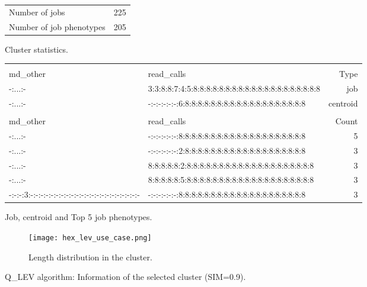 \documentclass{jhps}
\begin{document}
\begin{figure}
	\begin{subtable}{\textwidth}
		\centering
		\begin{tabular}{ll}
			Number of jobs & 225 \\
			Number of job phenotypes & 205 \\
		\end{tabular}
		\caption{Cluster statistics.}
		\label{cluster:use_case:hex_lev:stats}
	\end{subtable}
	\medskip
	\noindent\begin{subtable}{\textwidth}
		\centering
		\begin{tiny}
			\begin{tabular}{ll|r}
				\rowcolor{tblhead}
				\multicolumn{2}{l|}{Q-coding} & \\
				\rowcolor{tblhead}
				md\_other                                           &  read\_calls                                           & Type     \\
        \hline
        -:...:-                                             & 3:3:8:8:7:4:5:8:8:8:8:8:8:8:8:8:8:8:8:8:8:8:8:8:8:8:8 & job      \\ 
        -:...:-                                             & -:-:-:-:-:-:6:8:8:8:8:8:8:8:8:8:8:8:8:8:8:8:8:8:8:8   & centroid \\ 
				\multicolumn{3}{l}{}                                \\
				\rowcolor{tblhead}      md\_other                   &  read\_calls                                           & Count    \\
				\hline
        -:...:-                                             & -:-:-:-:-:-:8:8:8:8:8:8:8:8:8:8:8:8:8:8:8:8:8:8:8:8   & 5        \\ 
        -:...:-                                             & -:-:-:-:-:-:2:8:8:8:8:8:8:8:8:8:8:8:8:8:8:8:8:8:8:8   & 3        \\ 
        -:...:-                                             & 8:8:8:8:8:2:8:8:8:8:8:8:8:8:8:8:8:8:8:8:8:8:8:8:8:8   & 3        \\ 
        -:...:-                                             & 8:8:8:8:8:5:8:8:8:8:8:8:8:8:8:8:8:8:8:8:8:8:8:8:8:8   & 3        \\ 
        -:-:-:3:-:-:-:-:-:-:-:-:-:-:-:-:-:-:-:-:-:-:-:-:-:- & -:-:-:-:-:-:8:8:8:8:8:8:8:8:8:8:8:8:8:8:8:8:8:8:8:8   & 3        \\ 
      \end{tabular}
		\end{tiny}
		\caption{Job, centroid and Top 5 job phenotypes.}
		\label{cluster:use_case:hex_lev:top_jobs}
	\end{subtable}
	\medskip
	\begin{subfigure}{\textwidth}
		\centering
		\texttt{[image: hex\_lev\_use\_case.png]}
		\caption{Length distribution in the cluster.}
		\label{cluster:use_case:hex_lev:length}
	\end{subfigure}
	\caption{Q\_LEV algorithm: Information of the selected cluster (SIM=0.9).}
	\label{cluster:use_case:hex_lev}
\end{figure}
\end{document}
